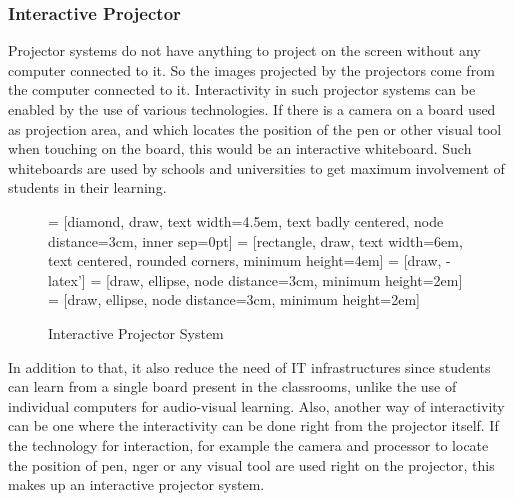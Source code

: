 \documentclass[12pt, a4paper]{article}
\begin{document}
\subsubsection{Interactive Projector}
Projector systems do not have anything to project on the screen without
any computer connected to it. So the images projected by the projectors
come from the computer connected to it. Interactivity in such projector
systems can be enabled by the use of various technologies. If there is a camera
on a board used as projection area, and which locates the position of the pen
or other visual tool when touching on the board, this would be an interactive
whiteboard. Such whiteboards are used by schools and universities to get
maximum involvement of students in their learning. 
\begin{figure} 
\centering
{} = [diamond, draw, text width=4.5em, text badly centered, node distance=3cm, inner sep=0pt]
 = [rectangle, draw, text width=6em, text centered, rounded corners, minimum height=4em]
 = [draw, -latex']
 = [draw, ellipse, node distance=3cm,
    minimum height=2em]
 = [draw, ellipse, node distance=3cm,
    minimum height=2em]
    
\caption{Interactive Projector System}\label{}
\end{figure}

In addition to that, it also reduce the need of IT infrastructures since students can learn from a
single board present in the classrooms, unlike the use of individual computers
for audio-visual learning. Also, another way of interactivity can be one where
the interactivity can be done right from the projector itself. If the technology
for interaction, for example the camera and processor to locate the position
of pen, nger or any visual tool are used right on the projector, this makes up
an interactive projector system. 
\end{document}

